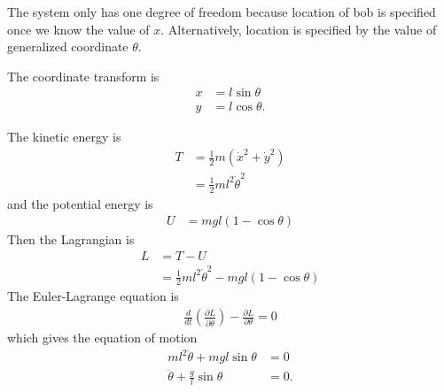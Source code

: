 The system only has one degree of freedom because location of bob is specified
once we know the value of $x$.
Alternatively,
location is specified by the value of generalized coordinate $\theta$.

The coordinate transform is
\begin{align}
    x &= l \sin\theta\\
    y &= l \cos\theta.
\end{align}

The kinetic energy is
\begin{align}
    T &= \frac{1}{2}m \left( \dot{x}^2 + \dot{y}^2 \right)\\
    &= \frac{1}{2}m l^2 \dot{\theta}^2
\end{align}
and the potential energy
is
\begin{align}
    U &= mgl(1 - \cos\theta)
\end{align}
Then the Lagrangian is
\begin{align}
    L &= T - U\\
    &= \frac{1}{2} ml^2 \dot{\theta}^2
    - mgl(1 - \cos\theta)
\end{align}
The Euler-Lagrange equation is
\begin{align}
    \frac{d}{dt}\left(\frac{\partial L}{\partial \dot{\theta}} \right)
    -
    \frac{\partial L}{\partial \theta} = 0
\end{align}
which gives the equation of motion
\begin{align}
    ml^2\ddot{\theta} + mgl\sin\theta &= 0\\
    \ddot{\theta} + \frac{g}{l}\sin\theta &= 0.
\end{align}

